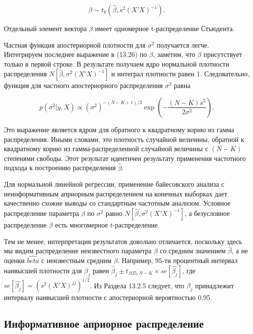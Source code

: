 \begin{equation}
\beta{\sim}t_{k}(\hat{\beta},s^2(X'X)^{-1}).
\end{equation}

Отдельный элемент вектора $\beta$ имеет одномерное t-распределение Стьюдента.

Частная функция апостериорной плотности для $\sigma^2$ получается легче. Интегрируем последнее выражение в (13.26) по $\beta$, заметим, что $\beta$ присутствует только в первой строке. В результате получаем ядро нормальной плотности распределения $N[\hat{\beta},\sigma^2(X'X)^{-1}]$ и интеграл плотности равен 1. Следовательно, функция для частного апостериорного распределения $\sigma^2$ равна

\begin{equation}
p(\sigma^2|y,X){\propto}(\sigma^2)^{-(N-K+1)/2}\exp\left(-\dfrac{(N-K)s^2}{2\sigma^2}\right). 
\end{equation}

Это выражение является ядром для обратного к квадратному корню из гамма распределения. Иными словами, это плотность случайной величины, обратной к квадратному корню из гамма-распределенной случайной величины с $(N-K)$ степенями свободы. Этот результат идентичен результату применения частотного подхода к построению распределения $\hat{\beta}$.

Для нормальной линейной регрессии, применение байесовского анализа с неинформативным  априорным распределением на конечных выборках дает качественно схожие выводы со стандартным частотным анализом. Условное распределение параметра $\beta$ по $\sigma^2$ равно $N[\hat{\beta},\sigma^{2}(X'X)^{-1}]$, а безусловное распределение $\beta$ есть многомерное $t$-распределение. 

Тем не менее, интерпретация результатов довольно отличается, поскольку здесь мы видим распределение  неизвестного параметра $\beta$ со средним значением $\hat{\beta}$, а не оценки $\hat{beta}$ с неизвестным средним $\beta$. Например, $95$-ти процентный интервал наивысшей плотности для $\beta_j$ равен $\hat{\beta}_j{\pm}t_{.025,N-K}{\times}se[\hat{\beta_j}]$, где $se[\hat{\beta_j}]=(s^{2}(X'X)^{jj})^{1/2}$. Из Раздела 13.2.5 следует, что $\beta_j$ принадлежит интервалу наивысшей плотности с апостериорной вероятностью 0.95.

\subsection{Информативное априорное распределение}

